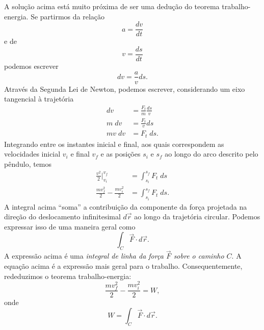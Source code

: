 A solução acima está muito próxima de ser uma dedução do teorema trabalho-energia. Se partirmos da relação
\begin{equation}
    a = \frac{dv}{dt}
\end{equation}
%
e de
\begin{equation}
    v = \frac{ds}{dt}
\end{equation}
%
podemos escrever
\begin{equation}
    dv = \frac{a}{v} ds.
\end{equation}
%
Através da Segunda Lei de Newton, podemos escrever, considerando um eixo tangencial à trajetória
\begin{align}
    dv &= \frac{F_t}{m} \frac{ds}{v} \\
    m \; dv &= \frac{F_t}{v} ds \\
    mv \; dv &= F_t \; ds.
\end{align}
%
Integrando entre os instantes inicial e final, aos quais correspondem as velocidades inicial $v_i$ e final $v_f$ e as posições $s_i$ e $s_f$ ao longo do arco descrito pelo pêndulo, temos
\begin{align}
    \frac{v^2}{2}\Big|_{v_i}^{v_f} &= \int_{s_i}^{s_f} F_t \; ds \\
    \frac{mv_f^2}{2} - \frac{mv_i^2}{2} &= \int_{s_i}^{s_f} F_t \; ds.
\end{align}
%
A integral acima ``soma'' a contribuição da componente da força projetada na direção do deslocamento infinitesimal $d\vec{r}$ ao longo da trajetória circular. Podemos expressar isso de uma maneira geral como
\begin{equation}
    \int_C \vec{F} \cdot d\vec{r}.
\end{equation}
%
A expressão acima é uma \emph{integral de linha da força $\vec{F}$ sobre o caminho $C$}. A equação acima é a expressão mais geral para o trabalho. Consequentemente, rededuzimos o teorema trabalho-energia:
\begin{equation}
    \frac{mv_f^2}{2} - \frac{mv_i^2}{2} = W,
\end{equation}
%
onde
\begin{equation}
    W = \int_C \vec{F} \cdot d\vec{r}.
\end{equation}





